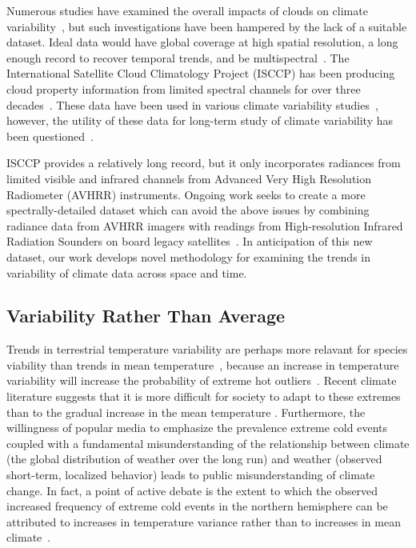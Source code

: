 \documentclass[letterpaper]{article} %
\newcommand{\citep}{\cite}
\begin{document}
Numerous
studies have examined the overall impacts of clouds on climate
variability~\citep{MyersMechoso2018,GrisePolvani2013,BenderRamanathan2012},
but such investigations have been hampered by the lack of a suitable
dataset. Ideal data would have global coverage at high spatial
resolution, a long enough record to recover temporal trends, and be
multispectral~\citep{WielickiYoung2013}. The International Satellite
Cloud Climatology Project (ISCCP)
has been producing cloud property information from
limited spectral channels for over three
decades~\citep{RossowSchiffer1991}. These data have been used in 
various climate variability
studies~\citep[e.g.]{BenderRamanathan2012}, however, the utility of
these data for long-term study of climate variability has been
questioned~\citep{EvanHeidinger2007}. 

ISCCP provides a relatively long record, but it only incorporates
radiances from limited visible and infrared channels from Advanced
Very High Resolution Radiometer (AVHRR) instruments. Ongoing work seeks to create a
more spectrally-detailed dataset which can avoid the above issues by
combining radiance data from AVHRR imagers with readings from High-resolution
Infrared Radiation Sounders on board legacy
satellites~\citep{StatenKahn2016,SchreierKahn2010,KahnFishbein2007}. In
anticipation of this new dataset, our work develops novel methodology
for examining the trends in variability of climate data across space
and time.



\subsection{Variability Rather Than Average}
\label{sec:vari-rath-than}

Trends in terrestrial temperature variability are perhaps more relavant for species
viability than trends in mean
temperature~\cite{huntingford_no_2013},
because an increase in
temperature variability will increase the probability of extreme hot
outliers~\cite{VasseurDeLong2014}. Recent climate literature
suggests that it is more difficult for society to adapt to these
extremes than to the gradual increase in the mean temperature
\cite{hansen_perception_2012,huntingford_no_2013}. Furthermore, the willingness of popular media to
emphasize the prevalence extreme cold events coupled with a
fundamental misunderstanding of the relationship between climate (the global
distribution of weather over the long run) and weather (observed
short-term, localized behavior) leads to public misunderstanding of climate
change. In fact, a point of active debate is the extent to which the observed
increased frequency of extreme cold events in the 
northern hemisphere can be attributed to increases in temperature
variance  rather than to increases in
mean climate~\cite{Screen2014,FischerBeyerle2013,TrenberthZhang2014}. 
\end{document}
